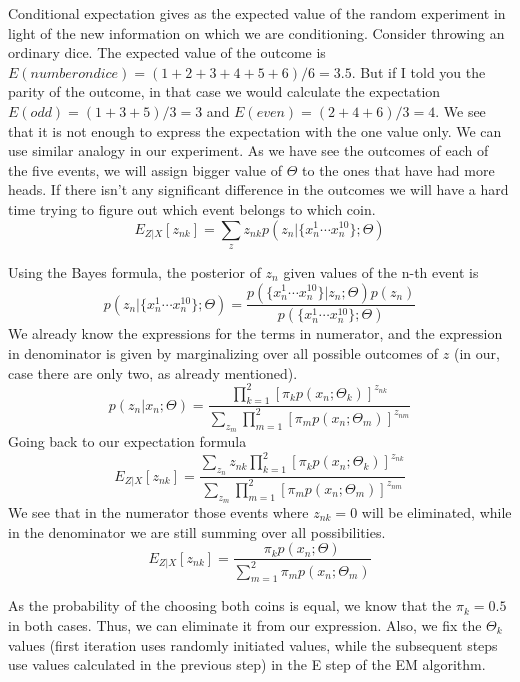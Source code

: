 \documentclass[11pt]{article}
\theoremstyle{plain}
\theoremstyle{definition}
\begin{document}
Conditional expectation gives as the expected value of the random experiment in light of the
new information on which we are conditioning. Consider throwing an ordinary dice. The expected value of the outcome is $E(number on dice)=(1+2+3+4+5+6)/6=3.5$. But if I told you the parity of the outcome, in that case we would calculate the expectation $E(odd)=(1+3+5)/3=3$ and $E(even)=(2+4+6)/3=4$. We see that it is not enough to express the expectation with the one value only. We can use similar analogy in our experiment. As we have see the outcomes of each of the five events, we will assign bigger value of $\Theta$ to the ones that have had more heads. If there isn't any significant difference in the outcomes we will have a hard time trying to figure out which event belongs to which coin.
\begin{equation}
  E_{Z|X}[z_{nk}]=
\sum_{z}z_{nk}p(z_n|\{x^1_n\cdots x^{10}_n\};\Theta)  
\end{equation}

Using the Bayes formula, the posterior of $z_n$ given values of the n-th event is
\begin{equation}
p(z_n|\{x^1_n\cdots x^{10}_n\};\Theta)=\frac{p(\{x^1_n\cdots x^{10}_n\}|z_n;\Theta)p(z_n)}{p(\{x^1_n\cdots x^{10}_n\};\Theta)}
\end{equation}
We already know the expressions for the terms in numerator, and the expression in denominator is given by marginalizing over all possible outcomes of $z$ (in our, case there are only two, as already mentioned). 
\begin{equation}
p(z_n|x_n;\Theta)=\frac{\prod_{k=1}^{2}[\pi_{k}p(x_n;\Theta_k)]^{z_{nk}}}{\sum_{z_m}\prod_{m=1}^{2}[\pi_{m}p(x_n;\Theta_m)]^{z_{nm}}}
\end{equation}
Going back to our expectation formula
\begin{equation}
E_{Z|X}[z_{nk}]=
\frac{\sum_{z_n}z_{nk}\prod_{k=1}^{2}[\pi_{k}p(x_n;\Theta_k)]^{z_{nk}}}{\sum_{z_m}\prod_{m=1}^{2}[\pi_{m}p(x_n;\Theta_m)]^{z_{nm}}}
\end{equation}
We see that in the numerator those events where $z_{nk}=0$ will be eliminated, while in the denominator we are still summing over all possibilities. 
\begin{equation}
E_{Z|X}[z_{nk}]=
\frac{\pi_{k}p(x_n;\Theta)}{\sum_{m=1}^{2}\pi_{m}p(x_n;\Theta_m)}
\end{equation}

As the probability of the choosing both coins is equal, we know that the $\pi_k=0.5$ in both cases. Thus, we can eliminate it from our expression. Also, we fix the $\Theta_k$ values (first iteration uses randomly initiated values, while the subsequent steps use values calculated in the previous step) in the E step of the EM algorithm. 
\end{document}
